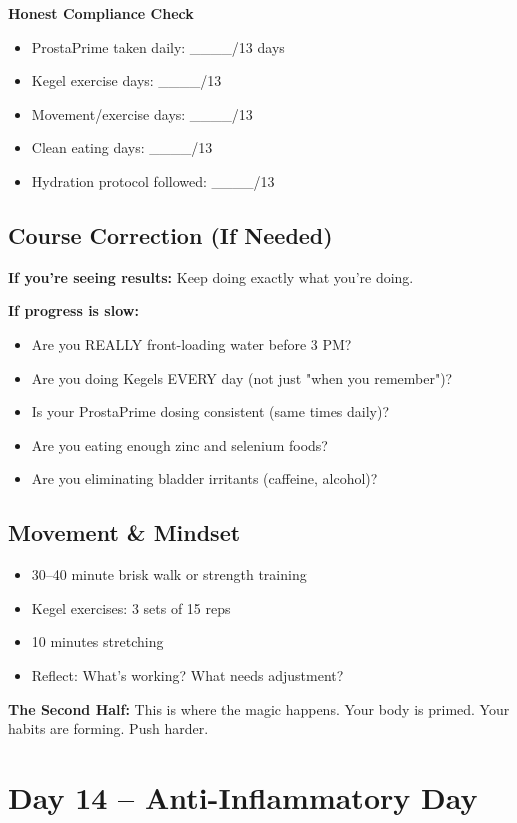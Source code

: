 \documentclass[11pt,oneside]{book}
\begin{document}
\textbf{Honest Compliance Check}
\begin{itemize}[leftmargin=*]
\item ProstaPrime taken daily: \_\_\_\_/13 days
\item Kegel exercise days: \_\_\_\_/13
\item Movement/exercise days: \_\_\_\_/13
\item Clean eating days: \_\_\_\_/13
\item Hydration protocol followed: \_\_\_\_/13
\end{itemize}

\section*{Course Correction (If Needed)}

\textbf{If you're seeing results:} Keep doing exactly what you're doing.

\textbf{If progress is slow:}
\begin{itemize}[leftmargin=*]
\item Are you REALLY front-loading water before 3 PM?
\item Are you doing Kegels EVERY day (not just "when you remember")?
\item Is your ProstaPrime dosing consistent (same times daily)?
\item Are you eating enough zinc and selenium foods?
\item Are you eliminating bladder irritants (caffeine, alcohol)?
\end{itemize}

\section*{Movement \& Mindset}
\begin{itemize}[leftmargin=*]
\item 30--40 minute brisk walk or strength training
\item Kegel exercises: 3 sets of 15 reps
\item 10 minutes stretching
\item Reflect: What's working? What needs adjustment?
\end{itemize}

\textbf{The Second Half:} This is where the magic happens. Your body is primed. Your habits are forming. Push harder.

\clearpage


\chapter*{Day 14 – Anti-Inflammatory Day}
\end{document}
